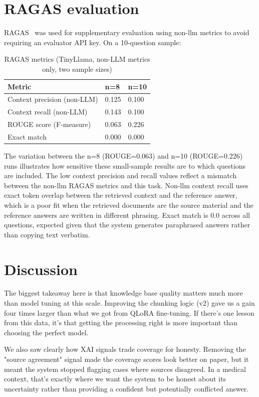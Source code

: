 \section{RAGAS evaluation}

RAGAS~\cite{es2023ragas} was used for supplementary evaluation using non-\ac{llm} metrics to avoid requiring an evaluator API key. On a 10-question sample:

\begin{table}[htbp]
\centering
\caption{RAGAS metrics (TinyLlama, non-LLM metrics only, two sample sizes)}
\renewcommand{\arraystretch}{1.3}
\begin{tabular}{|l|l|l|}
\hline
\textbf{Metric} & \textbf{n=8} & \textbf{n=10} \\
\hline
Context precision (non-LLM) & 0.125 & 0.100 \\
Context recall (non-LLM) & 0.143 & 0.100 \\
ROUGE score (F-measure) & 0.063 & 0.226 \\
Exact match & 0.000 & 0.000 \\
\hline
\end{tabular}
\end{table}

The variation between the n=8 (ROUGE=0.063) and n=10 (ROUGE=0.226) runs illustrates how sensitive these small-sample results are to which questions are included. The low context precision and recall values reflect a mismatch between the non-\ac{llm} RAGAS metrics and this task. Non-\ac{llm} context recall uses exact token overlap between the retrieved context and the reference answer, which is a poor fit when the retrieved documents are the source material and the reference answers are written in different phrasing. Exact match is 0.0 across all questions, expected given that the system generates paraphrased answers rather than copying text verbatim.

\section{Discussion}

The biggest takeaway here is that knowledge base quality matters much more than model tuning at this scale. Improving the chunking logic (v2) gave us a gain four times larger than what we got from QLoRA fine-tuning. If there’s one lesson from this data, it’s that getting the processing right is more important than choosing the perfect model.

We also saw clearly how XAI signals trade coverage for honesty. Removing the "source agreement" signal made the coverage scores look better on paper, but it meant the system stopped flagging cases where sources disagreed. In a medical context, that’s exactly where we want the system to be honest about its uncertainty rather than providing a confident but potentially conflicted answer.

